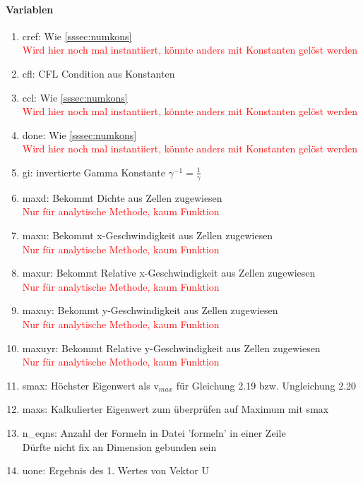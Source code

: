 \documentclass[12pt]{article}
\begin{document}
\renewcommand{\labelenumi}{\alph{enumi})} 
\paragraph{Variablen}
\begin{enumerate}
	\item cref: Wie \ref{sssec:numkons}\\
	\textcolor{red}{Wird hier noch mal instantiiert, könnte anders mit Konstanten gelöst werden}
	\item cfl:  CFL Condition aus Konstanten
	\item ccl: Wie \ref{sssec:numkons}\\
	\textcolor{red}{Wird hier noch mal instantiiert, könnte anders mit Konstanten gelöst werden}
	\item done: Wie \ref{sssec:numkons}\\
	\textcolor{red}{Wird hier noch mal instantiiert, könnte anders mit Konstanten gelöst werden}
	\item gi: invertierte Gamma Konstante $\gamma^{-1}=\frac{1}{\gamma}$
	\item maxd: Bekommt Dichte aus Zellen zugewiesen \\
	\textcolor{red}{Nur für analytische Methode, kaum Funktion}
	\item maxu: Bekommt x-Geschwindigkeit aus Zellen zugewiesen \\
	\textcolor{red}{Nur für analytische Methode, kaum Funktion}
	\item maxur: Bekommt Relative x-Geschwindigkeit aus Zellen zugewiesen \\
	\textcolor{red}{Nur für analytische Methode, kaum Funktion}
	\item maxuy: Bekommt y-Geschwindigkeit aus Zellen zugewiesen \\
	\textcolor{red}{Nur für analytische Methode, kaum Funktion}
	\item maxuyr: Bekommt Relative y-Geschwindigkeit aus Zellen zugewiesen \\
	\textcolor{red}{Nur für analytische Methode, kaum Funktion}
	\item smax: Höchster Eigenwert als v$_{max}$ für Gleichung 2.19 bzw. Ungleichung 2.20
	\item maxs: Kalkulierter Eigenwert zum überprüfen auf Maximum mit smax
	\item n\_eqns: Anzahl der Formeln in Datei 'formeln' in einer Zeile\\
	Dürfte nicht fix an Dimension gebunden sein
	\item uone: Ergebnis des 1. Wertes von Vektor U\\

\end{enumerate}
\end{document}
